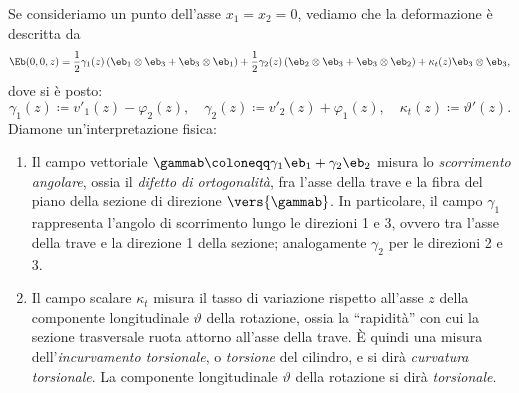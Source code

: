 Se consideriamo un punto dell'asse  $x_1=x_2=0$, vediamo che la deformazione è descritta da
\begin{equation}
\Eb(0,0,z)=\frac{1}{2}\gamma_1(z)\,(\eb_1\otimes\eb_3+\eb_3\otimes\eb_1)+\frac{1}{2}\gamma_2(z)\,(\eb_2\otimes\eb_3+\eb_3\otimes\eb_2)+\kappa_t(z) \eb_3\otimes\eb_3,
\end{equation}
dove si è posto:
\begin{equation}\label{gamkt}
\gamma_1(z)\coloneqq  v'_1(z)-\varphi_2(z), \quad \gamma_2(z)\coloneqq v'_2(z)+\varphi_1(z), \quad \kappa_t(z)\coloneqq\vartheta'(z).
\end{equation}
Diamone un'interpretazione fisica:
\begin{enumerate}
	\item Il campo vettoriale $\gammab\coloneqq \gamma_1\eb_1+\gamma_2\eb_2$ misura lo \emph{scorrimento angolare}, ossia il \emph{difetto di ortogonalità}, fra l'asse della trave e la fibra del piano della sezione di direzione $\vers{\gammab}$. In particolare, il campo $\gamma_1$ rappresenta l'angolo di scorrimento lungo le direzioni 1 e 3, ovvero tra l'asse della trave e la direzione 1 della sezione; analogamente  $\gamma_2$ per le direzioni 2 e 3.
	\item Il campo scalare $\kappa_t$ misura il tasso di  variazione rispetto all'asse $z$  della componente longitudinale $\vartheta$ della rotazione, ossia la ``rapidità'' con cui la sezione trasversale ruota attorno all'asse della trave.  \`{E} quindi una misura dell'\emph{incurvamento torsionale}, o \emph{torsione} del cilindro, e si dirà \emph{curvatura torsionale}. La componente longitudinale $\vartheta$ della rotazione si dirà \emph{torsionale}.
\end{enumerate}

